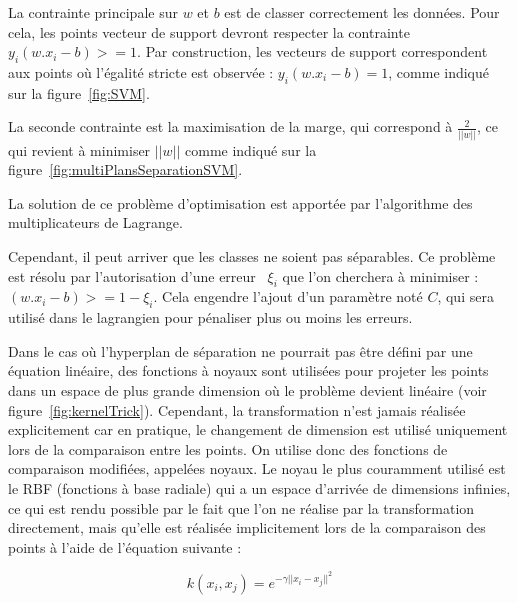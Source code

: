La contrainte principale sur $w$ et $b$ est de classer correctement les données. Pour cela, les points vecteur de support devront respecter la contrainte $y_i ( w . x_i - b ) >= 1$. Par construction, les vecteurs de support correspondent aux points où l'égalité stricte est observée : $y_i ( w . x_i - b ) = 1$, comme indiqué sur la figure~\ref{fig:SVM}.

La seconde contrainte est la maximisation de la marge, qui correspond à  $\frac{2}{||w||}$, ce qui revient à minimiser $||w||$ comme indiqué sur la figure~\ref{fig:multiPlansSeparationSVM}.

La solution de ce problème d'optimisation est apportée par l'algorithme des multiplicateurs de Lagrange. 

Cependant, il peut arriver que les classes ne soient pas séparables. Ce problème est résolu par l'autorisation d'une erreur~\cite{cortes1995support} $\xi_i$  que l'on cherchera à minimiser : $( w . x_i - b ) >= 1 - \xi_i $. Cela engendre l'ajout d'un paramètre noté $C$, qui sera utilisé dans le lagrangien pour pénaliser plus ou moins les erreurs.

Dans le cas où l'hyperplan de séparation ne pourrait pas être défini par une équation linéaire, des fonctions à noyaux sont utilisées pour projeter les points dans un espace de plus grande dimension où le problème devient linéaire (voir figure~\ref{fig:kernelTrick}). Cependant, la transformation n'est jamais réalisée explicitement car en pratique, le changement de dimension est utilisé uniquement lors de la comparaison entre les points. On utilise donc des fonctions de comparaison modifiées, appelées noyaux. Le noyau le plus couramment utilisé est le RBF (fonctions à base radiale) qui a un espace d'arrivée de dimensions infinies, ce qui est rendu possible par le fait que l'on ne réalise par la transformation directement, mais qu'elle est réalisée implicitement lors de la comparaison des points à l'aide de l'équation suivante :

\begin{equation}
k(x_i,x_j)=e^{-\gamma||x_i-x_j||^2}  
\end{equation}

